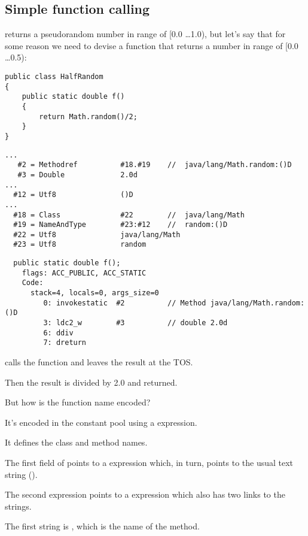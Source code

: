 \subsection{Simple function calling}

 returns a pseudorandom number in range of [0.0 \dots 1.0), but let's say that
for some reason we need to devise a function that returns a number in range of [0.0 \dots 0.5):


\begin{lstlisting}
public class HalfRandom
{ 
	public static double f()
	{
		return Math.random()/2;
	}
}
\end{lstlisting}

\begin{lstlisting}[caption=Constant pool]
...
   #2 = Methodref          #18.#19    //  java/lang/Math.random:()D
   #3 = Double             2.0d
...
  #12 = Utf8               ()D
...
  #18 = Class              #22        //  java/lang/Math
  #19 = NameAndType        #23:#12    //  random:()D
  #22 = Utf8               java/lang/Math
  #23 = Utf8               random
\end{lstlisting}

\begin{lstlisting}
  public static double f();
    flags: ACC_PUBLIC, ACC_STATIC
    Code:
      stack=4, locals=0, args_size=0
         0: invokestatic  #2          // Method java/lang/Math.random:()D
         3: ldc2_w        #3          // double 2.0d
         6: ddiv          
         7: dreturn       
\end{lstlisting}

 calls the  function and leaves the result at the \ac{TOS}.

Then the result is divided by 2.0 and returned.

But how is the function name encoded?

It's encoded in the constant pool using a  expression.

It defines the class and method names.

The first field of  points to a  expression which, in turn, points to
the usual text string ().

The second  expression points to a  expression which also 
has two links to the strings.

The first string is , which is the name of the method.

